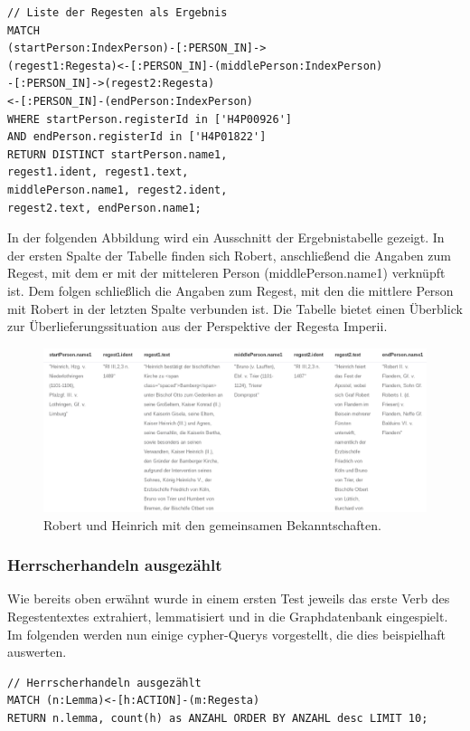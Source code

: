 \documentclass[12pt,ngerman,]{article}
\begin{document}
\begin{verbatim}
// Liste der Regesten als Ergebnis
MATCH
(startPerson:IndexPerson)-[:PERSON_IN]->
(regest1:Regesta)<-[:PERSON_IN]-(middlePerson:IndexPerson)
-[:PERSON_IN]->(regest2:Regesta)
<-[:PERSON_IN]-(endPerson:IndexPerson)
WHERE startPerson.registerId in ['H4P00926']
AND endPerson.registerId in ['H4P01822']
RETURN DISTINCT startPerson.name1,
regest1.ident, regest1.text,
middlePerson.name1, regest2.ident,
regest2.text, endPerson.name1;
\end{verbatim}

In der folgenden Abbildung wird ein Ausschnitt der Ergebnistabelle
gezeigt. In der ersten Spalte der Tabelle finden sich Robert,
anschließend die Angaben zum Regest, mit dem er mit der mitteleren
Person (middlePerson.name1) verknüpft ist. Dem folgen schließlich die
Angaben zum Regest, mit den die mittlere Person mit Robert in der
letzten Spalte verbunden ist. Die Tabelle bietet einen Überblick zur
Überlieferungssituation aus der Perspektive der Regesta Imperii.

\begin{figure}
\centering
\includegraphics{Bilder/RI2Graph/RobertHeinrichApocTabelle.png}
\caption{Robert und Heinrich mit den gemeinsamen Bekanntschaften.}
\end{figure}

\subsubsection{Herrscherhandeln
ausgezählt}\label{herrscherhandeln-ausgezuxe4hlt}

Wie bereits oben erwähnt wurde in einem ersten Test jeweils das erste
Verb des Regestentextes extrahiert, lemmatisiert und in die
Graphdatenbank eingespielt. Im folgenden werden nun einige cypher-Querys
vorgestellt, die dies beispielhaft auswerten.

\begin{verbatim}
// Herrscherhandeln ausgezählt
MATCH (n:Lemma)<-[h:ACTION]-(m:Regesta)
RETURN n.lemma, count(h) as ANZAHL ORDER BY ANZAHL desc LIMIT 10;
\end{verbatim}
\end{document}
